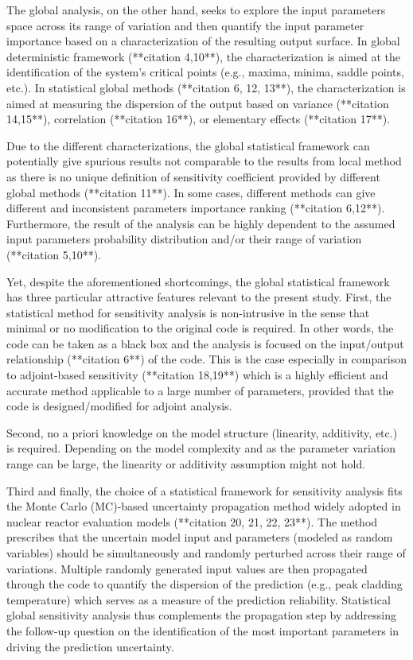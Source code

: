 The global analysis, on the other hand, 
seeks to explore the input parameters space across its range of variation 
and then quantify the input parameter importance based on a characterization of the resulting output surface. 
In global deterministic framework (**citation 4,10**), 
the characterization is aimed at the identification of the system’s critical points (e.g., maxima, minima, saddle points, etc.). 
In statistical global methods (**citation 6, 12, 13**), 
the characterization is aimed at measuring the dispersion of the output based on variance (**citation 14,15**), 
correlation (**citation 16**), or elementary effects (**citation 17**).

Due to the different characterizations, 
the global statistical framework can potentially give spurious results not comparable to the results from local method 
as there is no unique definition of sensitivity coefficient provided by different global methods (**citation 11**). 
In some cases, different methods can give different and inconsistent parameters importance ranking (**citation 6,12**). 
Furthermore, the result of the analysis can be highly dependent to the assumed input parameters probability distribution and/or their range of variation (**citation 5,10**).

Yet, despite the aforementioned shortcomings, 
the global statistical framework has three particular attractive features relevant to the present study. 
First, the statistical method for sensitivity analysis is non-intrusive in the sense that minimal or no modification to the original code is required. 
In other words, the code can be taken as a black box and the analysis is focused on the input/output relationship (**citation 6**) of the code. 
This is the case especially in comparison to adjoint-based sensitivity (**citation 18,19**) which is a highly efficient and accurate method applicable to a large number of parameters, 
provided that the code is designed/modified for adjoint analysis. 

Second, no a priori knowledge on the model structure (linearity, additivity, etc.) is required. 
Depending on the model complexity and as the parameter variation range can be large, 
the linearity or additivity assumption might not hold.

Third and finally, 
the choice of a statistical framework for sensitivity analysis fits the Monte Carlo (MC)-based uncertainty propagation method widely adopted in nuclear reactor evaluation models (**citation 20, 21, 22, 23**). 
The method prescribes that the uncertain model input and parameters (modeled as random variables) 
should be simultaneously and randomly perturbed across their range of variations. 
Multiple randomly generated input values are then propagated through the code to quantify the dispersion of the prediction (e.g., peak cladding temperature) 
which serves as a measure of the prediction reliability. 
Statistical global sensitivity analysis thus complements the propagation step 
by addressing the follow-up question on the identification of the most important parameters in driving the prediction uncertainty. 

